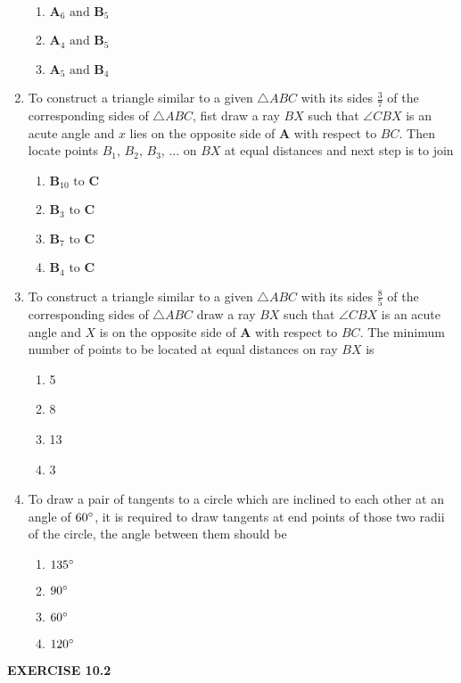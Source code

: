 \documentclass[12pt]{article}
\let\vec\mathbf
\begin{document}
\begin{enumerate}
\begin{enumerate}
\item $\vec{A}_6\text{ and }\vec{B}_5$
\item $\vec{A}_4\text{ and }\vec{B}_5$
\item $\vec{A}_5\text{ and }\vec{B}_4$
\end{enumerate}
\item To construct a triangle similar to a given $\triangle{ABC}$ with its sides $\frac{3}{7}$ of the corresponding sides of $\triangle{ABC}$, fist draw a ray $BX$ such that $\angle{CBX}$ is an acute angle and $x$ lies on 
the opposite side of $\vec{A}$ with respect to $BC$. Then locate points $B_1$, $B_2$, $B_3$, ... on $BX$ at equal distances and next step is to join
\begin{enumerate}
	\item $\vec{B}_{10}\text{ to }\vec{C}$
\item $\vec{B}_3\text{ to }\vec{C}$ 
\item $\vec{B}_7\text{ to }\vec{C}$
\item $\vec{B}_4\text{ to }\vec{C}$
\end{enumerate}
\item To construct a triangle similar to a given $\triangle{ABC}$ with its sides $\frac{8}{5}$ of the corresponding sides of $\triangle{ABC}$ draw a ray $BX$ such that $\angle{CBX}$ is an acute angle and $X$ is on the opposite side of $\vec{A}$ with respect to $BC$. The minimum number of points to be located at equal distances on ray $BX$ is 
\begin{enumerate}
\item 5
\item 8
\item 13
\item 3
\end{enumerate}
\item To draw a pair of tangents to a circle which are inclined to each other at an angle of $60\degree$, it is required
to draw tangents at end points of those two radii of the circle, the angle between them should be 
\begin{enumerate}
\item $135\degree$
\item $90\degree$
\item $60\degree$
\item $120\degree$ 
\end{enumerate}
\end{enumerate}
\begin{center}                            \textbf{EXERCISE 10.2}                    \end{center}
\end{document}
